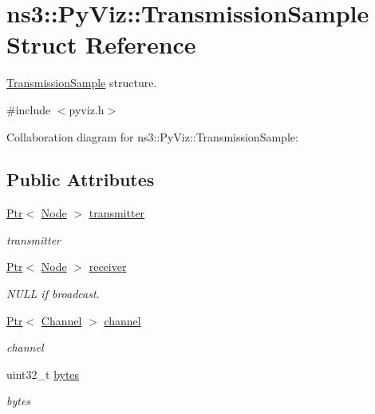 \hypertarget{structns3_1_1PyViz_1_1TransmissionSample}{}\section{ns3\+:\+:Py\+Viz\+:\+:Transmission\+Sample Struct Reference}
\label{structns3_1_1PyViz_1_1TransmissionSample}


\hyperlink{structns3_1_1PyViz_1_1TransmissionSample}{Transmission\+Sample} structure.  




{\ttfamily \#include $<$pyviz.\+h$>$}



Collaboration diagram for ns3\+:\+:Py\+Viz\+:\+:Transmission\+Sample\+:
\subsection*{Public Attributes}
\begin{DoxyCompactItemize}
\item 
\hyperlink{classns3_1_1Ptr}{Ptr}$<$ \hyperlink{classns3_1_1Node}{Node} $>$ \hyperlink{structns3_1_1PyViz_1_1TransmissionSample_a73327e8f2aba9c087cd4db2aa1d0a962}{transmitter}
\begin{DoxyCompactList}\small\item\em transmitter \end{DoxyCompactList}\item 
\hyperlink{classns3_1_1Ptr}{Ptr}$<$ \hyperlink{classns3_1_1Node}{Node} $>$ \hyperlink{structns3_1_1PyViz_1_1TransmissionSample_ad27e64165d1154bdf44f36e9f5adb758}{receiver}
\begin{DoxyCompactList}\small\item\em N\+U\+LL if broadcast. \end{DoxyCompactList}\item 
\hyperlink{classns3_1_1Ptr}{Ptr}$<$ \hyperlink{classns3_1_1Channel}{Channel} $>$ \hyperlink{structns3_1_1PyViz_1_1TransmissionSample_abe66e9e5905aaf85f4a04c69eb87b167}{channel}
\begin{DoxyCompactList}\small\item\em channel \end{DoxyCompactList}\item 
uint32\+\_\+t \hyperlink{structns3_1_1PyViz_1_1TransmissionSample_a273f8213a60d9fefb91ded7a474d1b6e}{bytes}
\begin{DoxyCompactList}\small\item\em bytes \end{DoxyCompactList}\end{DoxyCompactItemize}


